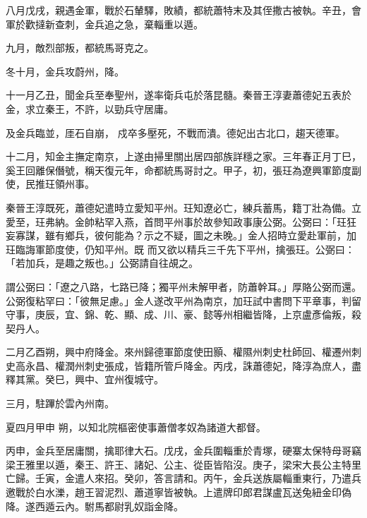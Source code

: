 \begin{pinyinscope}
 八月戊戌，親遇金軍，戰於石輦驛，敗績，都統蕭特末及其侄撒古被執。辛丑，會軍於歡撻新查刺，金兵追之急，棄輜重以遁。



 九月，敵烈部叛，都統馬哥克之。



 冬十月，金兵攻蔚州，降。



 十一月乙丑，聞金兵至奉聖州，遂率衛兵屯於落昆髓。秦晉王淳妻蕭德妃五表於金，求立秦王，不許，以勁兵守居庸。



 及金兵臨並，厓石自崩，
 戍卒多壓死，不戰而潰。德妃出古北口，趨天德軍。



 十二月，知金主撫定南京，上遂由掃里關出居四部族詳穩之家。三年春正月丁巳，奚王回離保僭號，稱天復元年，命都統馬哥討之。甲子，初，張玨為遼興軍節度副使，民推玨領州事。



 秦晉王淳既死，蕭德妃遣時立愛知平州。玨知遼必亡，練兵蓄馬，籍丁壯為備。立愛至，玨弗納。金帥粘罕入燕，首問平州事於故參知政事康公弼。公弼曰：「玨狂妄寡謀，雖有鄉兵，彼何能為？示之不疑，圖之未晚。」金人招時立愛赴軍前，加玨臨誨軍節度使，仍知平州。既
 而又欲以精兵三千先下平州，擒張玨。公弼曰：「若加兵，是趣之叛也。」公弼請自往覘之。



 謂公弼曰：「遼之八路，七路已降；獨平州未解甲者，防蕭幹耳。」厚賂公弼而還。公弼復粘罕曰：「彼無足慮。」金人遂改平州為南京，加玨試中書問下平章事，判留守事，庚辰，宜、錦、乾、顯、成、川、豪、懿等州相繼皆降，上京盧彥倫叛，殺契丹人。



 二月乙酉朔，興中府降金。來州歸德軍節度使田顥、權隰州刺史杜師回、權遷州刺史高永昌、權潤州刺史張成，皆籍所管戶降金。丙戌，誅蕭德妃，降淳為庶人，盡釋其黨。癸巳，興中、宜州復城守。



 三月，駐蹕於雲內州南。



 夏四月甲申
 朔，以知北院樞密使事蕭僧孝奴為諸道大都督。



 丙申，金兵至居庸關，擒耶律大石。戊戌，金兵圍輜重於青塚，硬寨太保特母哥竊梁王雅里以遁，秦王、許王、諸妃、公主、從臣皆陷沒。庚子，梁宋大長公主特里亡歸。壬寅，金遣人來招。癸卯，答言請和。丙午，金兵送族屬輜重東行，乃遣兵邀戰於白水濼，趙王習泥烈、蕭道寧皆被執。上遣牌印郎君謀盧瓦送兔紐金印偽降。遂西遁云內。駙馬都尉乳奴詣金降。




\end{pinyinscope}
